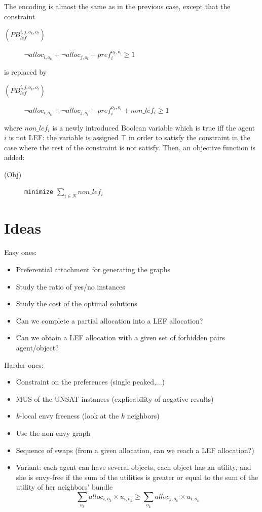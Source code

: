 \documentclass{article}
\begin{document}
The encoding is almost the same as in the previous case, except that the constraint
\begin{description}
	\item[$(PB_{lef}^{i,j,o_k,o_l})$] $\neg alloc_{i,o_k} + \neg alloc_{j,o_l} + pref_i^{o_k,o_l} \geq 1$
\end{description}
is replaced by
\begin{description}
	\item[$(PB_{lef}^{i,j,o_k,o_l})$] $\neg alloc_{i,o_k} + \neg alloc_{j,o_l} + pref_i^{o_k,o_l} + non\_lef_i \geq 1$
\end{description}
where $non\_lef_i$ is a newly introduced Boolean variable which is true iff the agent $i$ is not LEF: the variable is assigned $\top$ in order to satisfy the constraint in the case where the rest of the constraint is not satisfy. Then, an objective function is added:
\begin{description}
	\item[(Obj)] \verb+minimize+ $\sum_{i \in N} non\_lef_i$
\end{description}


\section{Ideas}
Easy ones:
\begin{itemize}
	\item Preferential attachment for generating the graphs
	\item Study the ratio of yes/no instances
	\item Study the cost of the optimal solutions
	\item Can we complete a partial allocation into a LEF allocation?
	\item Can we obtain a LEF allocation with a given set of forbidden pairs agent/object?
\end{itemize}

Harder ones:
\begin{itemize}
	\item Constraint on the preferences (single peaked,...)
	\item MUS of the UNSAT instances (explicability of negative results)
	\item $k$-local envy freeness (look at the $k$ neighbors)
	\item Use the non-envy graph
	\item Sequence of swaps (from a given allocation, can we reach a LEF allocation?)
	\item Variant: each agent can have several objects, each object has an utility, and she is envy-free if the sum of the utilities is greater or equal to the sum of the utility of her neighbors' bundle
	\[
	\sum_{o_k} alloc_{i,o_k} \times u_{i,o_k} \geq \sum_{o_k} alloc_{j,o_k} \times u_{i,o_k}
	\]
\end{itemize}
\end{document}
